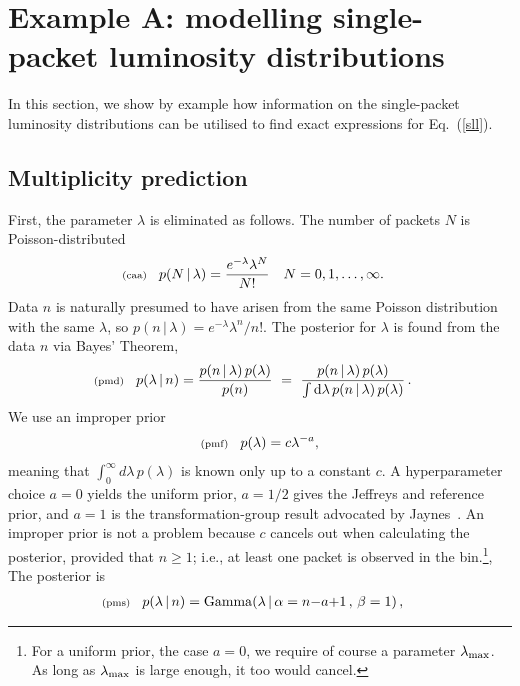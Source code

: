 \documentclass[11pt]{article}
\newcommand{\lleq}[1]{\label{#1} }
\renewcommand{\lleq}[1]{\label{#1} {\scriptstyle {\rm (#1)}} \hspace*{2ex} }
\newcommand{\cond}{\,|\,}
\DeclareMathOperator{\GammaDist}{Gamma}
\newcommand{\rmdx}[1]{\dd{#1}} %
\begin{document}
\section{Example A: modelling single-packet luminosity distributions} 
\label{sec:example}

In this section, we show by example how information on the
single-packet luminosity distributions can be utilised to find exact
expressions for Eq.~(\ref{sll}). 

\subsection{Multiplicity prediction}

First, the parameter $\lambda$ is eliminated as follows. The number of
packets $N$ is Poisson-distributed
\begin{align}
  \lleq{caa}
  p(N\cond\lambda) &= \frac{e^{-\lambda}\lambda^{N}}{N!}
  \quad N = 0,1,\ldots,\infty.
\end{align}
Data $n$ is naturally presumed to have arisen from the same Poisson
distribution with the same $\lambda$, so $p(n\cond\lambda) =
e^{-\lambda}\lambda^{n}/n!$. %
The posterior for $\lambda$ is found from the data $n$ via Bayes'
Theorem,
\begin{align}
  \lleq{pmd}
  p(\lambda\cond n) %
  &= \frac{p(n\cond\lambda)\,p(\lambda)} {p(n)}
  \ =\ \frac{p(n\cond\lambda)\,p(\lambda)} %
  {\int \rmdx{\lambda} p(n\cond\lambda)\,p(\lambda)} \,.
\end{align}
We use an improper prior 
\begin{align}
  \lleq{pmf}
  p(\lambda) = c \lambda^{-a},
\end{align}
meaning that $\int_0^\infty d\lambda\,p(\lambda)$ is known only up to
a constant $c$. A hyperparameter choice $a=0$ yields the uniform
prior, $a=1/2$ gives the Jeffreys and reference prior, and $a=1$ is
the transformation-group result advocated by
Jaynes~\cite[Ch. 12]{jaynes2003probability}. An improper prior is not
a problem because $c$ cancels out when calculating the posterior,
provided that $n \ge 1$; i.e., at least one packet is observed in the
bin.\footnote{For a uniform prior, the case $a{=}0$, we require of
  course a parameter $\lambda_{\rm max}$. As long as
  $\lambda_{\rm max}$ is large enough, it too would cancel.}, The
posterior is
\begin{align}
  \lleq{pms}
  p(\lambda\cond n) 
  &= \GammaDist(\lambda \cond \alpha = n{-}a{+}1 \,,\, \beta = 1)\,,
\end{align}
\end{document}
